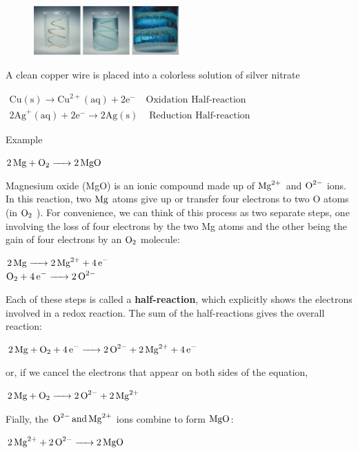 \documentclass[a4paper,12pt,twocolumn]{article}
\begin{document}
\begin{figure}[h]
\centering
\includegraphics[width=0.5\textwidth]{cupper.png}
\end{figure}
\begin{center}
A clean copper wire is placed into a colorless solution of silver nitrate
\end{center}


$\begin{array}{cc}
\mathrm{Cu}(\mathrm{s}) \rightarrow \mathrm{Cu}^{2+}(\mathrm{aq})+2 \mathrm{e}^{-} & \text {Oxidation Half-reaction } \\
2 \mathrm{Ag}^{+}(\mathrm{aq})+2 \mathrm{e}^{-} \rightarrow 2 \mathrm{Ag}(\mathrm{s}) & \text { Reduction Half-reaction }
\end{array}$
\newline
\begin{Box2}{Example}
\begin{center}
$\ce{2Mg + O2 -> 2MgO}$
\end{center}
Magnesium oxide (MgO) is an ionic compound made up of $\ce{Mg^{2+}}$ and $\ce{O^{2-}}$ ions. In
this reaction, two $\ce{Mg}$ atoms give up or transfer four electrons to two O atoms (in $\ce{O2}$ ).
For convenience, we can think of this process as two separate steps, one involving
the loss of four electrons by the two Mg atoms and the other being the gain of four
electrons by an $\ce{O2}$ molecule:
\begin{center}
$\ce{2Mg -> 2Mg^{2+} + 4e^-}$\\
$\ce{O2 + 4e^- -> 2O^{2-}}$
\end{center}
Each of these steps is called a \textbf{half-reaction}, which explicitly shows the electrons
involved in a redox reaction. The sum of the half-reactions gives the overall reaction:
\begin{center}
$\ce{2Mg + O2 + 4e^- ->  2O^{2-} + 2Mg^{2+} + 4e^-}$
\end{center}
or, if we cancel the electrons that appear on both sides of the equation,
\begin{center}
$\ce{2Mg + O2 ->  2O^{2-} + 2Mg^{2+}}$
\end{center}
Fially, the $\ce{O^{2-} and Mg^{2+}}$ ions combine to form $\ce{MgO}$:
\begin{center}
$\ce{2Mg^{2+} + 2O^{2-} -> 2MgO}$
\end{center}
\end{Box2}
\end{document}
